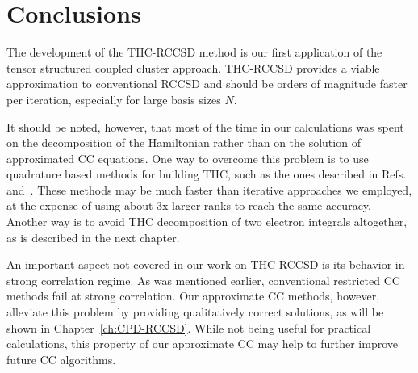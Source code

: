 \section{Conclusions}
The development of the THC-RCCSD method is our first application of the tensor 
structured coupled cluster approach.\cite{schutski2017tensor} THC-RCCSD provides 
a viable approximation to conventional RCCSD and should be orders of magnitude 
faster per iteration, especially for large basis sizes $N$. 

It should be noted, however, that most of the time in our 
calculations was spent on the decomposition of the Hamiltonian rather
than on the solution of approximated CC equations. 
One way to overcome this problem is to use quadrature based methods for 
building THC, such as the ones described in Refs.~\cite{hohenstein_thc1} 
and~\cite{parrish2013discrete}. These methods may be much
faster than iterative approaches we employed, at the expense of 
using about 3x larger ranks to reach the same 
accuracy.\cite{parrish2013discrete} Another way is to avoid THC decomposition 
of two electron integrals altogether, as is described in the next 
chapter.

An important aspect not covered in our work on THC-RCCSD is its behavior 
in strong correlation regime. As was mentioned earlier, conventional restricted 
CC methods fail at strong correlation. Our approximate CC methods, however, 
alleviate this problem by providing qualitatively correct solutions, as will be 
shown in Chapter~\ref{ch:CPD-RCCSD}. While not being useful for practical 
calculations, this property of our approximate CC may help to further improve 
future CC algorithms.